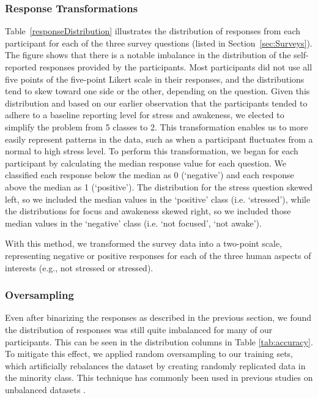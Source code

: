 \subsubsection{Response Transformations}
Table~\ref{responseDistribution} illustrates the distribution of responses from each participant for each of the three survey questions (listed in Section~\ref{sec:Surveys}). The figure shows that there is a notable imbalance in the distribution of the self-reported responses provided by the participants. Most participants did not use all five points of the five-point Likert scale in their responses, and the distributions tend to skew toward one side or the other, depending on the question. Given 
this distribution and based on our earlier observation that the participants tended to adhere to a baseline reporting level for stress and awakeness, we elected to simplify the problem from 5 classes to 2. This transformation enables us to more easily represent patterns in the data, such as when a participant fluctuates from a normal to high stress level. To perform this transformation, we began for
each participant by calculating the median response value for each question. We classified each response below the median as 0 (`negative') and each response above the median as 1 (`positive'). The distribution for the stress question skewed left, so we included the median values in the `positive' class (i.e. `stressed'), while the distributions for focus and awakeness skewed right, so we included those median values in the `negative' class (i.e. `not focused', `not awake').

With this method, we transformed the survey data into a two-point scale, representing  negative or positive responses for each of the three human aspects of interests (e.g., not stressed or stressed). 

\subsubsection{Oversampling}
Even after binarizing the responses as described in the previous section, we found the distribution of responses was still quite imbalanced for many of our participants. This can be seen in the distribution columns in Table \ref{tab:accuracy}. To mitigate this effect, we applied random oversampling to our training sets, which artificially rebalances the dataset by creating randomly replicated data in the minority class. This technique has commonly been used  in previous studies on unbalanced datasets \cite{chawla2004,yap2014}.

